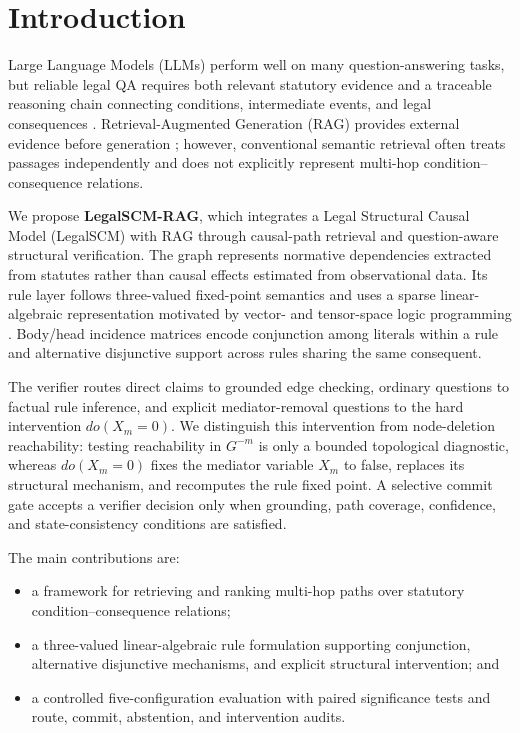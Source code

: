 \section{Introduction}
\label{sec:introduction}

Large Language Models (LLMs) perform well on many question-answering tasks, but
reliable legal QA requires both relevant statutory evidence and a traceable
reasoning chain connecting conditions, intermediate events, and legal
consequences \cite{chalkidis2020legalbert,guha2023legalbench}.
Retrieval-Augmented Generation (RAG) provides external evidence before
generation \cite{lewis2020retrieval,gao2024ragsurvey}; however, conventional
semantic retrieval often treats passages independently and does not explicitly
represent multi-hop condition--consequence relations.

We propose \textbf{LegalSCM-RAG}, which integrates a Legal Structural Causal
Model (LegalSCM) with RAG through causal-path retrieval and question-aware
structural verification. The graph represents normative dependencies extracted
from statutes rather than causal effects estimated from observational data. Its
rule layer follows three-valued fixed-point semantics
\cite{kleene1952metamathematics,fitting1985kripke} and uses a sparse
linear-algebraic representation motivated by vector- and tensor-space logic
programming \cite{sato2020threevalued,sakama2021tensor}. Body/head incidence
matrices encode conjunction among literals within a rule and alternative
disjunctive support across rules sharing the same consequent.

The verifier routes direct claims to grounded edge checking, ordinary questions
to factual rule inference, and explicit mediator-removal questions to the hard
intervention $do(X_m=0)$. We distinguish this intervention from node-deletion
reachability: testing reachability in $G^{-m}$ is only a bounded topological
diagnostic, whereas $do(X_m=0)$ fixes the mediator variable $X_m$ to false,
replaces its structural mechanism, and recomputes the rule fixed point. A
selective commit gate accepts a verifier decision only when grounding, path
coverage, confidence, and state-consistency conditions are satisfied.

The main contributions are:
\begin{itemize}
    \item a framework for retrieving and ranking multi-hop paths over statutory
    condition--consequence relations;
    \item a three-valued linear-algebraic rule formulation supporting
    conjunction, alternative disjunctive mechanisms, and explicit structural
    intervention; and
    \item a controlled five-configuration evaluation with paired significance
    tests and route, commit, abstention, and intervention audits.
\end{itemize}

